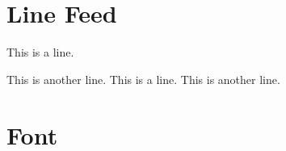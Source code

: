\documentclass{article}
\begin{document}
    \section{Line Feed}
        This is a line. 

        This is another line.
        This is a line. \newline
        This is another line. 
        
    \section{Font}
        
\end{document}
